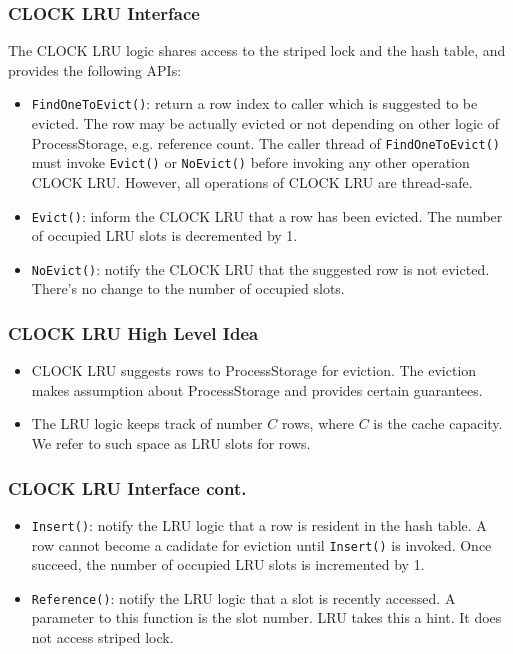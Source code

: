 \documentclass{beamer}
\begin{document}
\begin{frame}
\frametitle{CLOCK LRU Interface}
The CLOCK LRU logic shares access to the striped lock and the hash table, and 
provides the following APIs:

\begin{itemize}
\item \texttt{FindOneToEvict()}: return a row index to caller which is suggested
  to be evicted. The row may be actually evicted or not depending on other logic
  of ProcessStorage, e.g. reference count. The caller thread of 
  \texttt{FindOneToEvict()} must invoke \texttt{Evict()} or \texttt{NoEvict()} 
  before invoking any other operation CLOCK LRU. However, all operations of
  CLOCK LRU are thread-safe.

\item \texttt{Evict()}: inform the CLOCK LRU that a row has been evicted. The
number of occupied LRU slots is decremented by 1.

\item \texttt{NoEvict()}: notify the CLOCK LRU that the suggested row is not
evicted. There's no change to the number of occupied slots.

\end{itemize}
\end{frame}

\begin{frame}
  \frametitle{CLOCK LRU High Level Idea}
\begin{itemize}
\item CLOCK LRU suggests rows to ProcessStorage for eviction. The eviction makes 
assumption about ProcessStorage and provides certain guarantees.
\item The LRU logic keeps track of number $C$ rows, where $C$ is the cache capacity. We
refer to such space as LRU slots for rows. 
\end{itemize}
\end{frame}

\begin{frame}
\frametitle{CLOCK LRU Interface cont.}
\begin{itemize}
\item \texttt{Insert()}: notify the LRU logic that a row is resident in the 
  hash table. A row cannot become a cadidate for eviction until \texttt{Insert()}
  is invoked. Once succeed, the number of occupied LRU slots is incremented by 1.

\item \texttt{Reference()}: notify the LRU logic that a slot is recently accessed.
A parameter to this function is the slot number. LRU takes this a hint. It does 
not access striped lock.
\end{itemize}
\end{frame}
\end{document}
